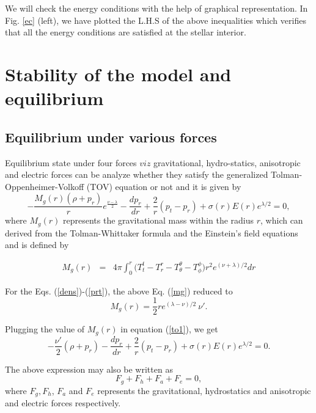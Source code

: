 \documentclass[preprintnumbers,amsmath,amssymb,floatfix,9pt,prd,twocolumn,
superscriptaddress,nofootinbib]{revtex4}
\begin{document}
We will check the energy conditions with the help of graphical representation. In Fig. \ref{ec} (left), we have plotted the L.H.S of the above inequalities which verifies that  all the energy conditions are satisfied at the stellar interior.



\section{Stability of the model and equilibrium}

\subsection{Equilibrium under various forces}
Equilibrium state under four forces $viz$ gravitational, hydro-statics, anisotropic and electric forces can be analyze whether they satisfy the generalized Tolman-Oppenheimer-Volkoff (TOV) equation or not and it is given by
\begin{equation}
-\frac{M_g(r)(\rho+p_r)}{r}e^{\frac{\nu-\lambda}{2}}-\frac{dp_r}{dr}+\frac{2}{r}(p_t-p_r)+\sigma(r) E(r) e^{\lambda/2}=0, \label{to1}
\end{equation}
where $M_g(r) $ represents the gravitational mass within the radius $r$, which can derived from the Tolman-Whittaker formula and the Einstein's field equations and is defined by

\begin{eqnarray}
M_g(r) &=& 4 \pi \int_0^r \big(T^t_t-T^r_r-T^\theta_\theta-T^\phi_\phi \big) r^2 e^{(\nu+\lambda)/2}dr \label{mg}
\end{eqnarray}

For the Eqs. (\ref{dens})-(\ref{prt}), the above Eq. (\ref{mg}) reduced to
\begin{equation}
M_g(r)=\frac{1}{2}re^{(\lambda-\nu)/2}~\nu'.
\end{equation}

Plugging the value of $M_g(r)$ in equation (\ref{to1}), we get
\begin{equation}
-\frac{\nu'}{2}(\rho+p_r)-\frac{dp_r}{dr}+\frac{2}{r}(p_t-p_r)+\sigma(r) E(r) e^{\lambda/2}=0.
\end{equation}

The above expression may also be written as
\begin{equation}
F_g+F_h+F_a+F_e=0,
\end{equation}
where $F_g, F_h$, $F_a$ and $F_e$ represents the gravitational, hydrostatics and anisotropic and electric forces respectively.\\
\end{document}
